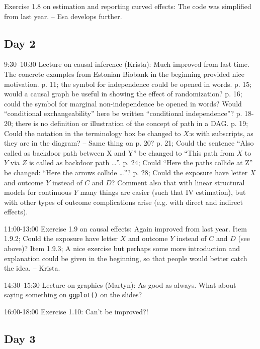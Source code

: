 \documentclass[11pt,a4]{article}
\begin{document}
Exercise 1.8 on estimation and reporting curved effects: 
The code was simplified from last year. 
-- Esa develops further. 

\subsection*{Day 2}


9:30--10:30 Lecture on causal inference (Krista): Much improved from last time. 
The concrete examples from Estonian Biobank in the beginning provided nice motivation. 
p. 11; the symbol for independence could be opened in words.
p. 15; would a causal graph be useful in showing the effect of randomization?
p. 16; could the symbol for marginal non-independence be opened in words?
 Would ``conditional exchangeability'' here be written ``conditional independence''?
p. 18-20; there is no definition or illustration of the concept of path in a DAG.
p. 19; Could the notation in the terminology box be changed to $X$:s with
subscripts, as they are in the diagram? -- Same thing on p. 20?
p. 21; Could the sentence ``Also called as backdoor path between X and Y'' be changed to 
``This path from $X$ to $Y$ via $Z$ is called as backdoor path \dots''.
p. 24; Could ``Here the paths collide at Z'' be changed: ``Here the arrows collide \dots''?
p. 28; Could the exposure have letter $X$ and outcome $Y$ instead of $C$ and $D$?
Comment also that with linear structural models for continuous 
$Y$ many things are easier (such that IV estimation),
but with other types of outcome complications arise (e.g. with direct and indirect effects).

11:00-13:00 Exercise 1.9 on causal effects: Again improved from last year.
Item 1.9.2; Could the exposure have letter $X$ and outcome $Y$ instead of $C$ and $D$ (see above)? 
Item 1.9.3; A nice exercise but perhaps some more introduction and explanation could be given
in the beginning, so that people would better catch the idea. 
 -- Krista. 


14:30--15:30 Lecture on graphics (Martyn): As good as always. What about saying something
on \texttt{ggplot()} on the slides?

16:00-18:00 Exercise 1.10: Can't be improved?!

\subsection*{Day 3}
\end{document}
